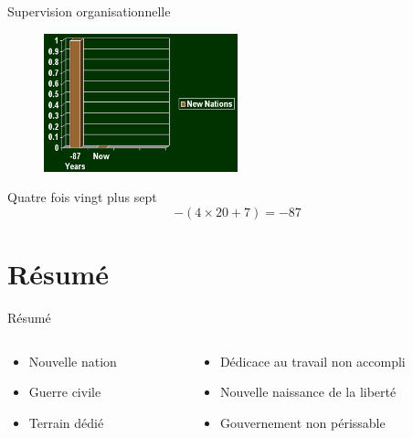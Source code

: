 \documentclass{beamer}
\begin{document}
\begin{frame}{Supervision organisationnelle}

\begin{figure}
\includegraphics[width=0.5\textwidth]{gettysburg_graph}
\end{figure}

\begin{block}{Quatre fois vingt plus sept}
\begin{equation}
-(4 \times 20 + 7) = -87
\end{equation}
\end{block}

\end{frame}

\section{Résumé}

\begin{frame}{Résumé}

\begin{columns}
\begin{column}{0.4\textwidth}
\begin{itemize}
\item Nouvelle nation
\item Guerre civile
\item Terrain dédié
\end{itemize}
\end{column}
\begin{column}{0.6\textwidth}
\begin{itemize}
\item Dédicace au travail non accompli
\item Nouvelle naissance de la liberté
\item Gouvernement non périssable
\end{itemize}
\end{column}
\end{columns}

\end{frame}
\end{document}
